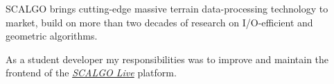 SCALGO brings cutting-edge massive terrain data-processing technology to market,
build on more than two decades of research on I/O-efficient and geometric
algorithms.

\medskip

As a student developer my responsibilities was to improve and maintain the
frontend of the \href{https://scalgo.com/live/}{\emph{SCALGO Live}} platform.
